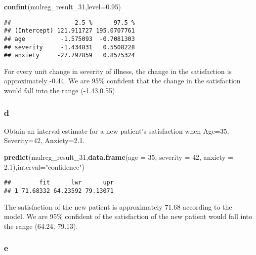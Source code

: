 \documentclass[]{article}
\newenvironment{Shaded}{\begin{snugshade}}{\end{snugshade}}
\newcommand{\KeywordTok}[1]{\textcolor[rgb]{0.13,0.29,0.53}{\textbf{#1}}}
\newcommand{\DataTypeTok}[1]{\textcolor[rgb]{0.13,0.29,0.53}{#1}}
\newcommand{\DecValTok}[1]{\textcolor[rgb]{0.00,0.00,0.81}{#1}}
\newcommand{\FloatTok}[1]{\textcolor[rgb]{0.00,0.00,0.81}{#1}}
\newcommand{\StringTok}[1]{\textcolor[rgb]{0.31,0.60,0.02}{#1}}
\newcommand{\NormalTok}[1]{#1}
\begin{document}
\begin{Shaded}
\begin{Highlighting}[]
\KeywordTok{confint}\NormalTok{(mulreg_result_}\DecValTok{31}\NormalTok{,}\DataTypeTok{level=}\FloatTok{0.95}\NormalTok{)}
\end{Highlighting}
\end{Shaded}

\begin{verbatim}
##                  2.5 %      97.5 %
## (Intercept) 121.911727 195.0707761
## age          -1.575093  -0.7081303
## severity     -1.434831   0.5508228
## anxiety     -27.797859   0.8575324
\end{verbatim}

For every unit change in severity of illness, the change in the
satisfaction is approximately -0.44. We are 95\% confident that the
change in the satisfaction would fall into the range (-1.43,0.55).

\subsubsection{d}\label{d-1}

Obtain an interval estimate for a new patient's satisfaction when
Age=35, Severity=42, Anxiety=2.1.

\begin{Shaded}
\begin{Highlighting}[]
\KeywordTok{predict}\NormalTok{(mulreg_result_}\DecValTok{31}\NormalTok{,}\KeywordTok{data.frame}\NormalTok{(}\DataTypeTok{age =} \DecValTok{35}\NormalTok{, }\DataTypeTok{severity =} \DecValTok{42}\NormalTok{, }\DataTypeTok{anxiety =} \FloatTok{2.1}\NormalTok{),}\DataTypeTok{interval=}\StringTok{"confidence"}\NormalTok{)}
\end{Highlighting}
\end{Shaded}

\begin{verbatim}
##        fit      lwr      upr
## 1 71.68332 64.23592 79.13071
\end{verbatim}

The satisfaction of the new patient is approximately 71.68 according to
the model. We are 95\% confident of the satisfaction of the new patient
would fall into the range (64.24, 79.13).

\subsubsection{e}\label{e-3}
\end{document}
